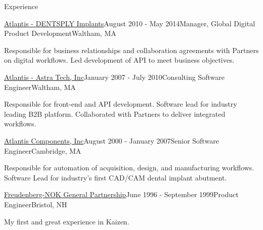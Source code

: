 \documentclass{resume}
\begin{document}
\begin{rSection}{Experience}
\begin{rSubsection}{\href{https://dentsplysirona.com}{Atlantis - DENTSPLY Implants}}{August 2010 - May 2014}{Manager, Global Digital Product Development}{Waltham, MA}
\item Responsible for business relationships and collaboration agreements with Partners on digital workflows.  Led development of API to meet business objectives.
\end{rSubsection}

\begin{rSubsection}{\href{https://dentsplysirona.com}{Atlantis - Astra Tech, Inc}}{January 2007 - July 2010}{Consulting Software Engineer}{Waltham, MA}
\item Responsible for front-end and API development. Software lead for industry leading B2B platform. Collaborated with Partners to deliver integrated workflows.
\end{rSubsection}

\begin{rSubsection}{\href{https://dentsplysirona.com}{Atlantis Components, Inc}}{August 2000 - January 2007}{Senior Software Engineer}{Cambridge, MA}
\item Responsible for automation of acquisition, design, and manufacturing workflows. Software Lead for industry's first CAD/CAM dental implant abutment.
\end{rSubsection}

\pagebreak

\begin{rSubsection}{\href{https://fst.com}{Freudenberg-NOK General Partnership}}{June 1996 - September 1999}{Product Engineer}{Bristol, NH}
\item My first and great experience in Kaizen.
\end{rSubsection}

\end{rSection}
\end{document}
